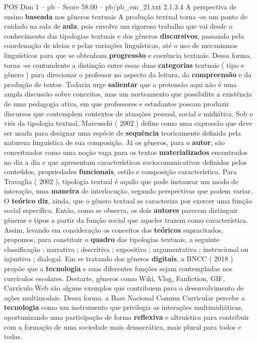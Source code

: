 \begin{textsample}{POS Dim 1 – pb – Score 58.00 – pb/pb\_em\_21.txt}  \label{ex:f1_pos_144}
2.1.3.4 A perspectiva de ensino \textbf{baseada} nos gêneros textuais A produção textual torna -se um ponto de cuidado na sala de \textbf{aula}, pois envolve um rigoroso trabalho que vai desde o conhecimento das tipologias textuais e dos gêneros \textbf{discursivos}, passando pela coordenação de ideias e pelas variações linguísticas, até o uso de mecanismos linguísticos para que se obtenham \textbf{progressão} e coerência textuais.
Dessa forma, torna -se contundente a distinção entre essas duas \textbf{categorias} textuais ( tipo e gênero ) para direcionar o professor no aspecto da leitura, da \textbf{compreensão} e da produção de textos.
Todavia urge \textbf{salientar} que a pretensão aqui não é uma ampla discussão sobre conceitos, mas um norteamento que possibilite a existência de uma pedagogia ativa, em que professores e estudantes possam produzir discursos que contemplem contextos de atuações pessoal, social e midiática.
Sob o viés da tipologia textual, Marcuschi ( 2002 ) define como uma expressão que deve ser usada para designar uma espécie de \textbf{sequência} teoricamente definida pela natureza linguística de sua composição.
Já os gêneros, para o \textbf{autor}, são conceituados como uma noção vaga para os textos \textbf{materializados} encontrados no dia a dia e que apresentam características sociocomunicativas definidas pelos conteúdos, propriedades \textbf{funcionais}, estilo e composição característica.
Para Travaglia ( 2002 ), tipologia textual é aquilo que pode instaurar um modo de interação, uma \textbf{maneira} de interlocução, segundo perspectivas que podem variar.
O \textbf{teórico} \textbf{diz}, ainda, que o gênero textual se caracteriza por exercer uma função social específica.
Então, como se observa, os dois \textbf{autores} parecem distinguir gêneros e tipos a partir da função social que aqueles trazem como característica.
Assim, levando em consideração os conceitos dos \textbf{teóricos} supracitados, propomos, para constituir o \textbf{quadro} das tipologias textuais, a seguinte classificação : narrativa ; descritiva ; expositiva ; argumentativa ; instrucional ou injuntiva ; dialogal.
Em se tratando dos gêneros \textbf{digitais}, a BNCC ( 2018 ) propõe que a \textbf{tecnologia} e suas diferentes funções sejam contempladas nos currículos escolares.
Destarte, gêneros como Wiki, Vlog, Fanfiction, GIF, Currículo Web são alguns exemplos que contribuem para o desenvolvimento de ações multimodais.
Dessa forma, a Base Nacional Comum Curricular percebe a \textbf{tecnologia} como um instrumento que privilegia as interações multimidiáticas, oportunizando uma participação de forma \textbf{reflexiva} e altruística para contribuir com a formação de uma sociedade mais democrática, mais plural para todos e todas.

\end{textsample}
